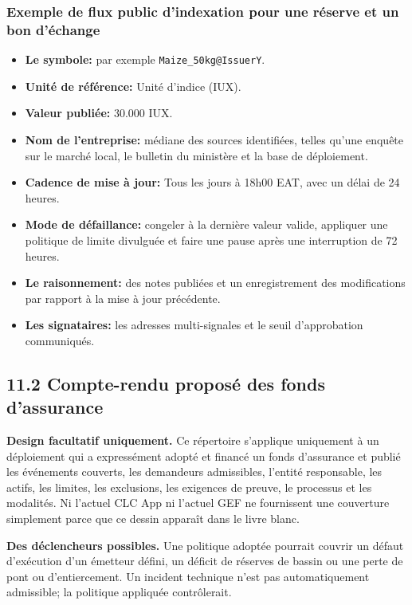 \documentclass[11pt]{article}
\begin{document}
\subsubsection*{Exemple de flux public d'indexation pour une réserve et un bon d'échange}

\begin{itemize}[leftmargin=*]
\item \textbf{Le symbole:} par exemple \texttt{Maize\_50kg@IssuerY}.
\item \textbf{Unité de référence:} Unité d'indice (IUX).
\item \textbf{Valeur publiée:} 30.000 IUX.
\item \textbf{Nom de l'entreprise:} médiane des sources identifiées, telles qu'une enquête sur le marché local, le bulletin du ministère et la base de déploiement.
\item \textbf{Cadence de mise à jour:} Tous les jours à 18h00 EAT, avec un délai de 24 heures.
\item \textbf{Mode de défaillance:} congeler à la dernière valeur valide, appliquer une politique de limite divulguée et faire une pause après une interruption de 72 heures.
\item \textbf{Le raisonnement:} des notes publiées et un enregistrement des modifications par rapport à la mise à jour précédente.
\item \textbf{Les signataires:} les adresses multi-signales et le seuil d'approbation communiqués.
\end{itemize}
\subsection*{11.2 Compte-rendu proposé des fonds d'assurance}

\textbf{Design facultatif uniquement.} Ce répertoire s'applique uniquement à un déploiement qui a expressément adopté et financé un fonds d'assurance et publié les événements couverts, les demandeurs admissibles, l'entité responsable, les actifs, les limites, les exclusions, les exigences de preuve, le processus et les modalités. Ni l'actuel CLC App ni l'actuel GEF ne fournissent une couverture simplement parce que ce dessin apparaît dans le livre blanc.

\textbf{Des déclencheurs possibles.} Une politique adoptée pourrait couvrir un défaut d'exécution d'un émetteur défini, un déficit de réserves de bassin ou une perte de pont ou d'entiercement. Un incident technique n'est pas automatiquement admissible; la politique appliquée contrôlerait.
\end{document}
